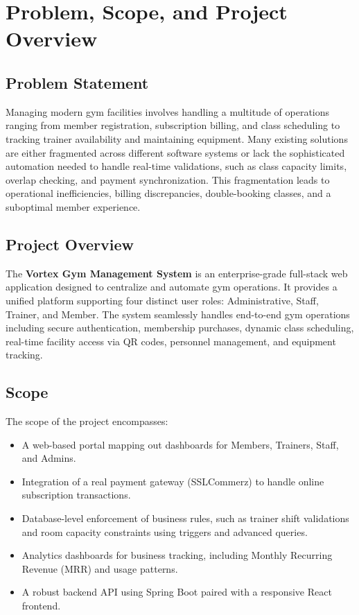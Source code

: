 \documentclass[12pt,a4paper]{article}
\begin{document}
\tableofcontents
\newpage

\section{Problem, Scope, and Project Overview}
\subsection{Problem Statement}
Managing modern gym facilities involves handling a multitude of operations ranging from member registration, subscription billing, and class scheduling to tracking trainer availability and maintaining equipment. Many existing solutions are either fragmented across different software systems or lack the sophisticated automation needed to handle real-time validations, such as class capacity limits, overlap checking, and payment synchronization. This fragmentation leads to operational inefficiencies, billing discrepancies, double-booking classes, and a suboptimal member experience.

\subsection{Project Overview}
The \textbf{Vortex Gym Management System} is an enterprise-grade full-stack web application designed to centralize and automate gym operations. It provides a unified platform supporting four distinct user roles: Administrative, Staff, Trainer, and Member. The system seamlessly handles end-to-end gym operations including secure authentication, membership purchases, dynamic class scheduling, real-time facility access via QR codes, personnel management, and equipment tracking.

\subsection{Scope}
The scope of the project encompasses:
\begin{itemize}
    \item A web-based portal mapping out dashboards for Members, Trainers, Staff, and Admins.
    \item Integration of a real payment gateway (SSLCommerz) to handle online subscription transactions.
    \item Database-level enforcement of business rules, such as trainer shift validations and room capacity constraints using triggers and advanced queries.
    \item Analytics dashboards for business tracking, including Monthly Recurring Revenue (MRR) and usage patterns.
    \item A robust backend API using Spring Boot paired with a responsive React frontend.
\end{itemize}
\end{document}

